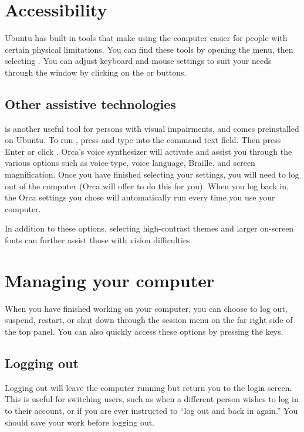 \section{Accessibility} 
Ubuntu has built-in tools that make using the computer easier for people with certain physical limitations. You can find these tools by opening the  menu, then selecting . You can adjust keyboard and mouse settings to suit your needs through the  window by clicking on the  or  buttons.  



\subsection{Other assistive technologies}
 is another useful tool for persons with visual impairments, and comes preinstalled on Ubuntu. To run , press  and type  into the command text field. Then press Enter or click . Orca's voice synthesizer will activate and assist you through the various options such as voice type, voice language, Braille, and screen magnification. Once you have finished selecting your settings, you will need to log out of the computer (Orca will offer to do this for you). When you log back in, the Orca settings you chose will automatically run every time you use your computer.

In addition to these options, selecting high-contrast themes and larger on-screen fonts can further assist those with vision difficulties.

\section{Managing your computer}
When you have finished working on your computer, you can choose to log out, suspend, restart, or shut down through the session menu on the far right side of the top panel. You can also quickly access these options by pressing the  keys.

\subsection{Logging out}
Logging out will leave the computer running but return you to the login screen. This is useful for switching users, such as when a different person wishes to log in to their account, or if you are ever instructed to ``log out and back in again.'' 
You should save your work before logging out.

